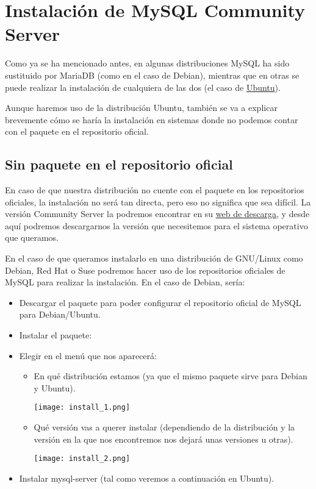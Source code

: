 \section{Instalación de MySQL Community Server}
Como ya se ha mencionado antes, en algunas distribuciones MySQL ha sido sustituido por MariaDB (como en el caso de Debian), mientras que en otras se puede realizar la instalación de cualquiera de las dos (el caso de \hyperlink{ubuntu}{Ubuntu}).

Aunque haremos uso de la distribución Ubuntu, también se va a explicar brevemente cómo se haría la instalación en sistemas donde no podemos contar con el paquete en el repositorio oficial.

\subsection{Sin paquete en el repositorio oficial}
En caso de que nuestra distribución no cuente con el paquete en los repositorios oficiales, la instalación no será tan directa, pero eso no significa que sea difícil. La versión Community Server la podremos encontrar en su \href{https://dev.mysql.com/downloads/mysql/}{web de descarga}, y desde aquí podremos descargarnos la versión que necesitemos para el sistema operativo que queramos.

En el caso de que queramos instalarlo en una distribución de GNU/Linux como Debian, Red Hat o Suse podremos hacer uso de los repositorios oficiales de MySQL para realizar la instalación. En el caso de Debian, sería:

\begin{itemize}
    \item Descargar el paquete para poder configurar el repositorio oficial de MySQL para Debian/Ubuntu.
    \item Instalar el paquete:
    \item Elegir en el menú que nos aparecerá:
    \begin{itemize}
        \item En qué distribución estamos (ya que el mismo paquete sirve para Debian y Ubuntu).
        \begin{center}
            \texttt{[image: install\_1.png]}
        \end{center}

        \item Qué versión vas a querer instalar (dependiendo de la distribución y la versión en la que nos encontremos nos dejará unas versiones u otras).
        \begin{center}
            \texttt{[image: install\_2.png]}
        \end{center}
    \end{itemize}

    \item Instalar mysql-server (tal como veremos a continuación en Ubuntu).

\end{itemize}


